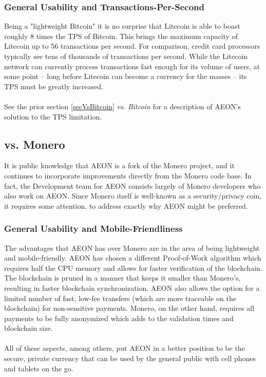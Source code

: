 \subsubsection{General Usability and Transactions-Per-Second}
Being a "lightweight Bitcoin" it is no surprise that Litecoin is able to boast roughly 8 times the TPS of Bitcoin.  This brings the maximum capacity of Litecoin up to 56 transactions per second. For comparison, credit card processors typically see tens of thousands of transactions per second. While the Litecoin network can currently process transactions fast enough for its volume of users, at some point -- long before Litecoin can become a currency for the masses -- its TPS must be greatly increased.\\
\\
See the prior section \ref{secVsBitcoin} \textit{vs. Bitcoin} for a description of AEON's solution to the TPS limitation.

\subsection{vs. Monero}
It is public knowledge that AEON is a fork of the Monero project, and it continues to incorporate improvements directly from the Monero code base.  In fact, the Development team for AEON consists largely of Monero developers who also work on AEON.  Since Monero itself is well-known as a security/privacy coin, it requires some attention, to address exactly why AEON might be preferred.

\subsubsection{General Usability and Mobile-Friendliness}
The advantages that AEON has over Monero are in the area of being lightweight and mobile-friendly.  AEON has chosen a different Proof-of-Work algorithm which requires half the CPU memory and allows for faster verification of the blockchain.  The blockchain is pruned in a manner that keeps it smaller than Monero's, resulting in faster blockchain synchronization.  AEON also allows the option for a limited number of fast, low-fee transfers (which are more traceable on the blockchain) for non-sensitive payments.  Monero, on the other hand, requires all payments to be fully anonymized which adds to the validation times and blockchain size.\\
\\
All of these aspects, among others, put AEON in a better position to be the secure, private currency that can be used by the general public with cell phones and tablets on the go.

